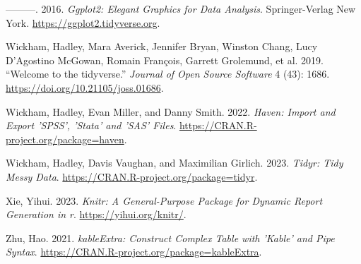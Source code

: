 \documentclass[
]{article}
\newlength{\cslhangindent}
\newlength{\cslentryspacingunit} %
\newenvironment{CSLReferences}[2] %
 {%
  \setlength{\parindent}{0pt}
  \ifodd #1
  \let\oldpar\par
  \def\par{\hangindent=\cslhangindent\oldpar}
  \fi
  \setlength{\parskip}{#2\cslentryspacingunit}
 }%
 {}
\begin{document}
\begin{CSLReferences}{1}{0}
\leavevmode{}%
---------. 2016. \emph{Ggplot2: Elegant Graphics for Data Analysis}.
Springer-Verlag New York. \url{https://ggplot2.tidyverse.org}.

\leavevmode{}%
Wickham, Hadley, Mara Averick, Jennifer Bryan, Winston Chang, Lucy
D'Agostino McGowan, Romain François, Garrett Grolemund, et al. 2019.
{``Welcome to the {tidyverse}.''} \emph{Journal of Open Source Software}
4 (43): 1686. \url{https://doi.org/10.21105/joss.01686}.

\leavevmode{}%
Wickham, Hadley, Evan Miller, and Danny Smith. 2022. \emph{Haven: Import
and Export 'SPSS', 'Stata' and 'SAS' Files}.
\url{https://CRAN.R-project.org/package=haven}.

\leavevmode{}%
Wickham, Hadley, Davis Vaughan, and Maximilian Girlich. 2023.
\emph{Tidyr: Tidy Messy Data}.
\url{https://CRAN.R-project.org/package=tidyr}.

\leavevmode{}%
Xie, Yihui. 2023. \emph{Knitr: A General-Purpose Package for Dynamic
Report Generation in r}. \url{https://yihui.org/knitr/}.

\leavevmode{}%
Zhu, Hao. 2021. \emph{kableExtra: Construct Complex Table with 'Kable'
and Pipe Syntax}. \url{https://CRAN.R-project.org/package=kableExtra}.

\end{CSLReferences}
\end{document}
